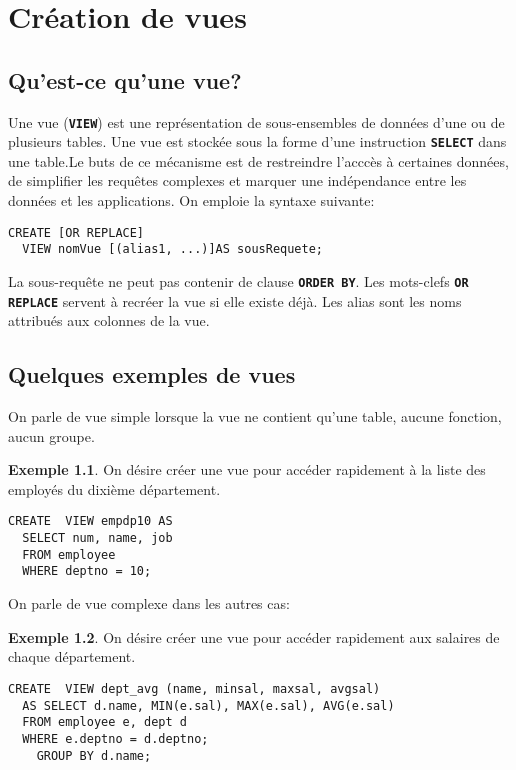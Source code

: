 \documentclass[a4paper, 12pt]{report}
\newcommand{\textSQL}[1]{\texttt{\textbf{#1}}}
\theoremstyle{definition} \newtheorem{ex}{Exemple}
\begin{document}
\chapter{Création de vues}
\section[Introduction]{Qu'est-ce qu'une vue?}
Une vue (\textSQL{VIEW}) est une représentation de sous-ensembles de données d'une ou de plusieurs tables. Une vue est stockée sous la forme d'une instruction \textSQL{SELECT} dans une table.Le buts de ce mécanisme est de restreindre l'acccès à certaines données, de simplifier les requêtes complexes et marquer une indépendance entre les données et les applications. On emploie la syntaxe suivante:
\begin{lstlisting}[frame=single]
CREATE [OR REPLACE]
  VIEW nomVue [(alias1, ...)]AS sousRequete;
\end{lstlisting}

La sous-requête ne peut pas contenir de clause \textSQL{ORDER BY}. Les mots-clefs \textSQL{OR REPLACE} servent à recréer la vue si elle existe déjà. Les alias sont les noms attribués aux colonnes de la vue.

\section{Quelques exemples de vues}
On parle de vue simple lorsque la vue ne contient qu'une table, aucune fonction, aucun groupe.
\begin{ex}
On désire créer une vue pour accéder rapidement à la liste des employés du dixième département.
\begin{lstlisting}[frame=single]
CREATE  VIEW empdp10 AS
  SELECT num, name, job
  FROM employee
  WHERE deptno = 10;
\end{lstlisting}
\end{ex}

On parle de vue complexe dans les autres cas:
\begin{ex}
On désire créer une vue pour accéder rapidement aux salaires de chaque département.
\begin{lstlisting}[frame=single]
CREATE  VIEW dept_avg (name, minsal, maxsal, avgsal)
  AS SELECT d.name, MIN(e.sal), MAX(e.sal), AVG(e.sal)
  FROM employee e, dept d
  WHERE e.deptno = d.deptno;
	GROUP BY d.name;
\end{lstlisting}
\end{ex}
\end{document}

